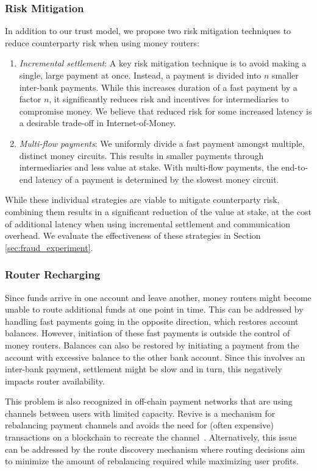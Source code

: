 \subsubsection*{Risk Mitigation}
In addition to our trust model, we propose two risk mitigation techniques to reduce counterparty risk when using money routers:
\begin{enumerate}
	\item \emph{Incremental settlement}: A key risk mitigation technique is to avoid making a single, large payment at once. Instead, a payment is divided into $ n $ smaller inter-bank payments. While this increases duration of a fast payment by a factor $ n $, it significantly reduces risk and incentives for intermediaries to compromise money. We believe that reduced risk for some increased latency is a desirable trade-off in Internet-of-Money.
	\item \emph{Multi-flow payments}: We uniformly divide a fast payment amongst multiple, distinct money circuits. This results in smaller payments through intermediaries and less value at stake. With multi-flow payments, the end-to-end latency of a payment is determined by the slowest money circuit.
\end{enumerate}
While these individual strategies are viable to mitigate counterparty risk, combining them results in a significant reduction of the value at stake, at the cost of additional latency when using incremental settlement and communication overhead.
We evaluate the effectiveness of these strategies in Section \ref{sec:fraud_experiment}.

\subsubsection*{Router Recharging}
Since funds arrive in one account and leave another, money routers might become unable to route additional funds at one point in time.
This can be addressed by handling fast payments going in the opposite direction, which restores account balances.
However, initiation of these fast payments is outside the control of money routers.
Balances can also be restored by initiating a payment from the account with excessive balance to the other bank account.
Since this involves an inter-bank payment, settlement might be slow and in turn, this negatively impacts router availability.

This problem is also recognized in off-chain payment networks that are using channels between users with limited capacity.
Revive is a mechanism for rebalancing payment channels and avoids the need for (often expensive) transactions on a blockchain to recreate the channel~\cite{khalil2017revive}.
Alternatively, this issue can be addressed by the route discovery mechanism where routing decisions aim to minimize the amount of rebalancing required while maximizing user profits.

